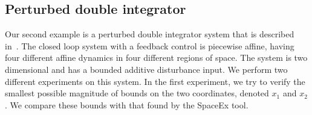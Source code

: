 \subsection{Perturbed double integrator}
Our second example is a perturbed double integrator system that is
described in~\cite{rakovic2004computation}.  The closed loop system
with a feedback control is piecewise affine, having four different
affine dynamics in four different regions of space.  The system is two
dimensional and has a bounded additive disturbance input.  We perform
two different experiments on this system.  In the first experiment, we
try to verify the smallest possible magnitude of bounds on the two
coordinates, denoted $x_1$ and $x_2$. We compare these bounds with
that found by the SpaceEx tool.



